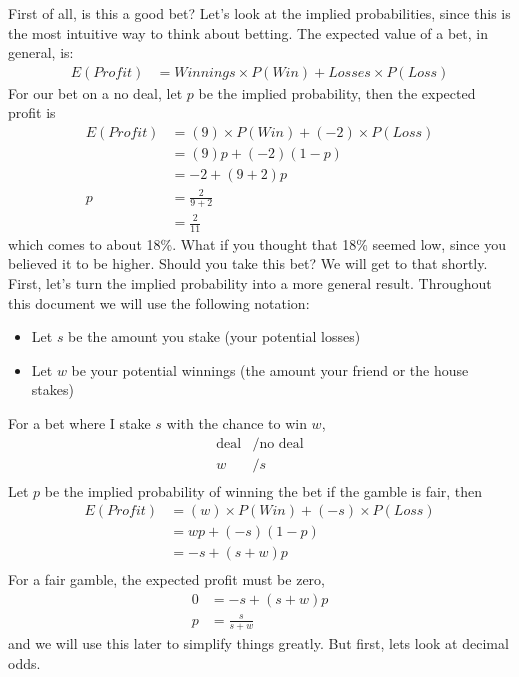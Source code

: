 \documentclass[a4paper]{article}
\begin{document}
First of all, is this a good bet? Let's look at the implied probabilities, since this is the most intuitive way to think about betting.
The expected value of a bet, in general, is:
\begin{align*}
E(Profit) &=
Winnings \times P(Win) +
Losses   \times P(Loss)
\end{align*}
For our bet on a no deal, let $p$ be the implied probability, then the expected profit is
\begin{align*}
E(Profit)
&=
(9)    \times P(Win) +
(-2)   \times P(Loss) \\
&= (9)    p  + (-2)  (1-p) \\
&= -2 + (9 + 2)p   \\
p &= \frac{2}{9 + 2}   \\
  &= \frac{2}{11}
\end{align*}
which comes to about 18\%.
What if you thought that 18\% seemed low, since you believed it to be higher. Should you take this bet?
We will get to that shortly.
First, let's turn the implied probability into a more general result.
Throughout this document we will use the following notation:
\begin{itemize}
 \item Let $s$ be the amount you stake (your potential losses)
 \item Let $w$ be your potential winnings (the amount your friend or the house stakes)
\end{itemize}
For a bet where I stake $s$ with the chance to win $w$,
\begin{align*}
\text{deal}&/\text{no deal}  \\
w &/ s  \\
\end{align*}
Let $p$ be the implied probability of winning the bet if the gamble is fair, then
\begin{align*}
E(Profit)
&=
(w)    \times P(Win) +
(-s)   \times P(Loss)  \\
&=
wp +
(-s)(1-p)  \\
&= -s + (s + w)p  \nonumber \\
\end{align*}
For a fair gamble, the expected profit must be zero,
\begin{align}
0
&= -s + (s + w)p  \nonumber \\
p &= \frac{s}{s + w} \label{eq:implied_prob}
\end{align}
and we will use this later to simplify things greatly.
But first, lets look at decimal odds.
\end{document}
